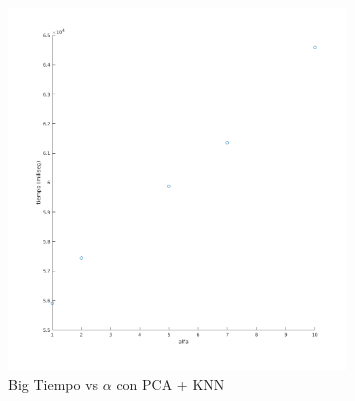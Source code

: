 \begin{figure}[H]
	\centering	\includegraphics[width=0.8\textwidth]{img/big_alfa_pca_tiempo.png}
	\caption{Big Tiempo vs $\alpha$ con PCA + KNN}
	\label{fig:Big Tiempo vs Alpha con PCA + KNN}
\end{figure}





